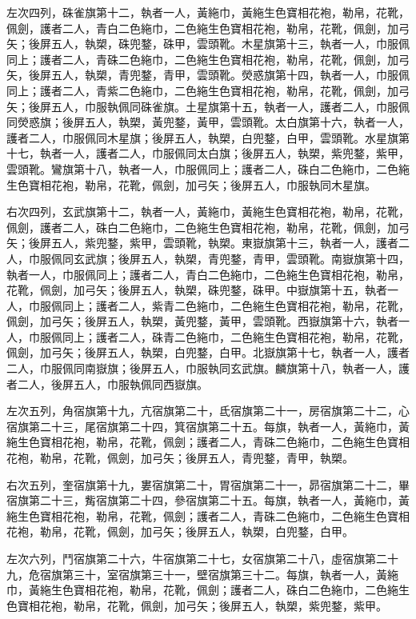 \begin{pinyinscope}
 左次四列，硃雀旗第十二，執者一人，黃絁巾，黃絁生色寶相花袍，勒帛，花靴，佩劍，護者二人，青白二色絁巾，二色絁生色寶相花袍，勒帛，花靴，佩劍，加弓矢；後屏五人，執槊，硃兜鍪，硃甲，雲頭靴。木星旗第十三，執者一人，巾服佩同上；護者二人，青硃二色絁巾，二色絁生色寶相花袍，勒帛，花靴，佩劍，加弓矢，後屏五人，執槊，青兜鍪，青甲，雲頭靴。熒惑旗第十四，執者一人，巾服佩同上；護者二人，青紫二色絁巾，二色絁生色寶相花袍，勒帛，花靴，佩劍，加弓矢；後屏五人，巾服執佩同硃雀旗。土星旗第十五，執者一人，護者二人，巾服佩同熒惑旗；後屏五人，執槊，黃兜鍪，黃甲，雲頭靴。太白旗第十六，執者一人，護者二人，巾服佩同木星旗；後屏五人，執槊，白兜鍪，白甲，雲頭靴。水星旗第十七，執者一人，護者二人，巾服佩同太白旗；後屏五人，執槊，紫兜鍪，紫甲，雲頭靴。鸞旗第十八，執者一人，巾服佩同上；護者二人，硃白二色絁巾，二色絁生色寶相花袍，勒帛，花靴，佩劍，加弓矢；後屏五人，巾服執同木星旗。



 右次四列，玄武旗第十二，執者一人，黃絁巾，黃絁生色寶相花袍，勒帛，花靴，佩劍，護者二人，硃白二色絁巾，二色絁生色寶相花袍，勒帛，花靴，佩劍，加弓矢；後屏五人，紫兜鍪，紫甲，雲頭靴，執槊。東嶽旗第十三，執者一人，護者二人，巾服佩同玄武旗；後屏五人，執槊，青兜鍪，青甲，雲頭靴。南嶽旗第十四，執者一人，巾服佩同上；護者二人，青白二色絁巾，二色絁生色寶相花袍，勒帛，花靴，佩劍，加弓矢；後屏五人，執槊，硃兜鍪，硃甲。中嶽旗第十五，執者一人，巾服佩同上；護者二人，紫青二色絁巾，二色絁生色寶相花袍，勒帛，花靴，佩劍，加弓矢；後屏五人，執槊，黃兜鍪，黃甲，雲頭靴。西嶽旗第十六，執者一人，巾服佩同上；護者二人，硃青二色絁巾，二色絁生色寶相花袍，勒帛，花靴，佩劍，加弓矢；後屏五人，執槊，白兜鍪，白甲。北嶽旗第十七，執者一人，護者二人，巾服佩同南嶽旗；後屏五人，巾服執同玄武旗。麟旗第十八，執者一人，護者二人，後屏五人，巾服執佩同西嶽旗。



 左次五列，角宿旗第十九，亢宿旗第二十，氐宿旗第二十一，房宿旗第二十二，心宿旗第二十三，尾宿旗第二十四，箕宿旗第二十五。每旗，執者一人，黃絁巾，黃絁生色寶相花袍，勒帛，花靴，佩劍；護者二人，青硃二色絁巾，二色絁生色寶相花袍，勒帛，花靴，佩劍，加弓矢；後屏五人，青兜鍪，青甲，執槊。



 右次五列，奎宿旗第十九，婁宿旗第二十，胃宿旗第二十一，昴宿旗第二十二，畢宿旗第二十三，觜宿旗第二十四，參宿旗第二十五。每旗，執者一人，黃絁巾，黃絁生色寶相花袍，勒帛，花靴，佩劍；護者二人，青硃二色絁巾，二色絁生色寶相花袍，勒帛，花靴，佩劍，加弓矢；後屏五人，執槊，白兜鍪，白甲。



 左次六列，鬥宿旗第二十六，牛宿旗第二十七，女宿旗第二十八，虛宿旗第二十九，危宿旗第三十，室宿旗第三十一，壁宿旗第三十二。每旗，執者一人，黃絁巾，黃絁生色寶相花袍，勒帛，花靴，佩劍；護者二人，硃白二色絁巾，二色絁生色寶相花袍，勒帛，花靴，佩劍，加弓矢；後屏五人，執槊，紫兜鍪，紫甲。




\end{pinyinscope}
